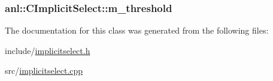 \label{classanl_1_1CImplicitSelect_a2443fec206da41910cd53431389f61bf}
\hypertarget{classanl_1_1CImplicitSelect_a21822251cc4e21a7777e221da684930d}{
\subsubsection[{m\_\-threshold}]{ {\bf anl::CImplicitSelect::m\_\-threshold}}}
\label{classanl_1_1CImplicitSelect_a21822251cc4e21a7777e221da684930d}


The documentation for this class was generated from the following files:\begin{DoxyCompactItemize}
\item 
include/\hyperlink{implicitselect_8h}{implicitselect.h}\item 
src/\hyperlink{implicitselect_8cpp}{implicitselect.cpp}\end{DoxyCompactItemize}
